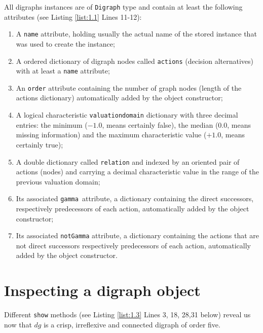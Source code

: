 All digraphs instances are of \texttt{Digraph} type and contain at least the following attributes (see Listing \ref{list:1.1}  Lines 11-12):
\begin{enumerate}
\item A \texttt{name} attribute, holding usually the actual name of the stored instance that was used to create the instance;
\item A ordered dictionary of digraph nodes called \texttt{actions} (decision alternatives) with at least a \texttt{name} attribute;
\item An \texttt{order} attribute containing the number of graph nodes (length of the actions dictionary) automatically added by the object constructor;
\item  A logical characteristic \texttt{valuationdomain} dictionary with three decimal entries: the minimum ($-1.0$, means certainly false), the median ($0.0$, means missing information) and the maximum characteristic value ($+1.0$, means certainly true);
\item A double dictionary called \texttt{relation} and indexed by an oriented pair of actions (nodes) and carrying a decimal characteristic value in the range of the previous valuation domain;
\item Its associated \texttt{gamma }attribute, a dictionary containing the direct successors, respectively predecessors of each action, automatically added by the object constructor;
\item Its associated \texttt{notGamma} attribute, a dictionary containing the actions that are not direct successors respectively predecessors of each action, automatically added by the object constructor.
\end{enumerate}

\section{Inspecting a digraph object}
\label{sec:1.4}

Different \texttt{show} methods (see Listing \ref{list:1.3}  Lines 3, 18, 28,31 below) reveal us now that $dg$ is a crisp, irreflexive and connected digraph of order five.


